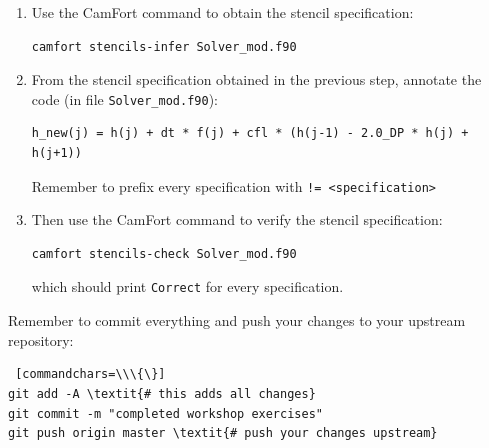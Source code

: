 \documentclass[12pt]{article}
\begin{document}
\begin{enumerate}
\begin{enumerate}
\item Use the CamFort command to obtain the stencil specification:
\begin{verbatim}
camfort stencils-infer Solver_mod.f90
\end{verbatim}
\item From the stencil specification obtained in the previous step, annotate the code (in file \texttt{Solver\_mod.f90}):
\begin{verbatim}
h_new(j) = h(j) + dt * f(j) + cfl * (h(j-1) - 2.0_DP * h(j) + h(j+1))
\end{verbatim}
Remember to prefix every specification with \texttt{!= <specification>} 
\item Then use the CamFort command to verify the stencil specification:
\begin{verbatim}
camfort stencils-check Solver_mod.f90
\end{verbatim}
which should print \texttt{Correct} for every specification. 
\end{enumerate}
\end{enumerate}
Remember to commit everything and push your changes to your upstream repository:
\begin{Verbatim} [commandchars=\\\{\}]
git add -A \textit{# this adds all changes}
git commit -m "completed workshop exercises"
git push origin master \textit{# push your changes upstream}
\end{Verbatim}
\end{document}
